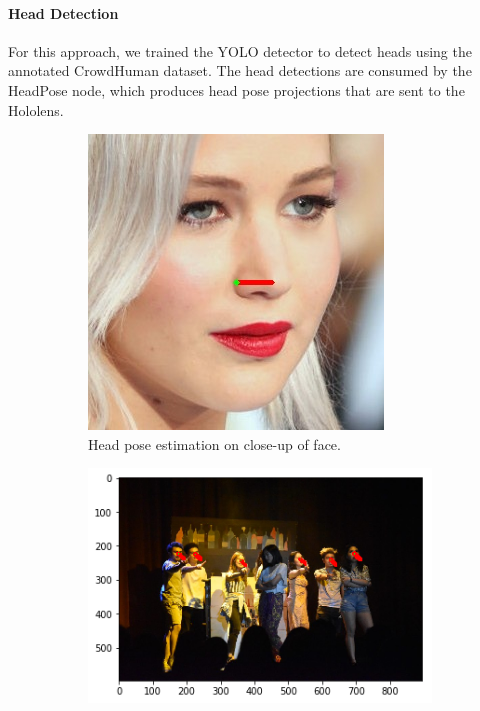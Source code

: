 \paragraph{Head Detection} For this approach, we trained the YOLO detector to detect heads using the annotated CrowdHuman dataset. The head detections are consumed by the HeadPose node, which produces head pose projections that are sent to the Hololens.

\begin{figure}[ht]
    \begin{subfigure}[b]{.5\textwidth}
        \centering
        \includegraphics[width=0.675\linewidth]{img/chapter4_analysis/headPose.jpeg}
        \caption{Head pose estimation on close-up of face.}
    \end{subfigure}%
    \hspace{\fill} 
    \begin{subfigure}[b]{.5\textwidth}
        \centering
        \includegraphics[width=1.0\linewidth]{img/chapter4_analysis/deepgazeWhole.png}

\end{subfigure}
\end{figure}
